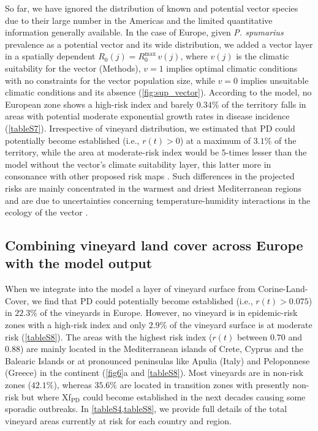     So far, we have ignored the distribution of known and potential vector
    species due to their large number in the Americas and the limited
    quantitative information generally available. In the case of Europe, given
    \textit{P. spumarius} prevalence as a potential
    vector and its wide distribution, we added	a vector layer in a spatially
    dependent $R_0(j) = R_0^{\textrm{max}}\, v(j)$, where $v(j)$ is the
    climatic
    suitability for the vector (Methods), $v=1$ implies optimal climatic
    conditions
    with no constraints for the vector population size, while $v=0$ implies
    unsuitable climatic conditions and its absence (\cref{fig:sup_vector}).
    According to the model, no European zone shows a high-risk index and barely
$0.34\%$ of the territory falls in areas with potential moderate exponential
    growth rates in disease incidence (\cref{tableS7}). Irrespective of
    vineyard distribution, we estimated that PD could potentially become
    established (i.e., $r(t) > 0$) at a maximum of $3.1\%$ of the territory,
    while the area at moderate-risk index would be $5$-times lesser than the
    model without the vector's climate suitability layer, this latter more in
    consonance with other proposed risk maps \cite{Godefroid2019,Bragard2019}.
    Such differences in the projected risks are mainly concentrated in the
    warmest and driest Mediterranean regions and are due to uncertainties
    concerning temperature-humidity interactions in the ecology of the vector
    \cite{Godefroid2021}.

    \subsection{Combining vineyard land cover across Europe with the model
        output}
    When we integrate into the model a layer of vineyard surface from
    Corine-Land-Cover, we find that PD could potentially become established
    (i.e.,
$r(t)>0.075$) in $22.3\%$ of the vineyards in Europe. However, no vineyard is
    in epidemic-risk zones with a high-risk index and only $2.9\%$ of the
    vineyard surface is at moderate risk (\cref{tableS8}). The areas with the
    highest risk index ($r(t)$ between $0.70$ and $0.88$) are mainly located in
    the Mediterranean islands of Crete, Cyprus and the Balearic Islands or at
    pronounced peninsulas like Apulia (Italy) and Peloponnese (Greece) in the
    continent (\cref{fig6}a and \cref{tableS8}).  Most vineyards are in
    non-risk zones ($42.1\%$), whereas $35.6\%$ are located in transition zones
    with presently non-risk but where Xf$_{\textrm{PD}}$ could become
    established in the next decades causing some sporadic outbreaks. In
    \cref{tableS4,tableS8}, we provide full details of the total vineyard
    areas currently at risk for each country and region.

